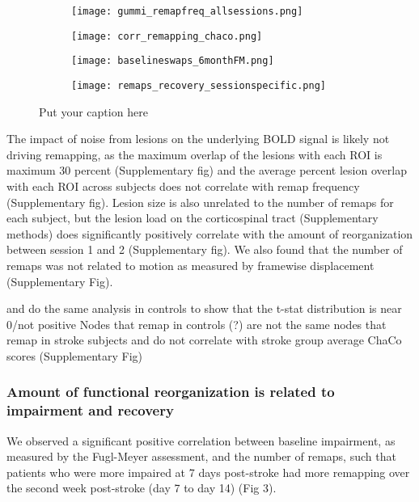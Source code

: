 \documentclass[10pt]{article}
\begin{document}
	\begin{figure}[ht]
		\begin{subfigure}{.5\textwidth}
			\centering
			\texttt{[image: gummi\_remapfreq\_allsessions.png]}  

			\label{fig:sub-first}
		\end{subfigure}
		\begin{subfigure}{.5\textwidth}
			\centering
			\texttt{[image: corr\_remapping\_chaco.png]}  

			\label{fig:sub-second}
		\end{subfigure}
	\end{figure}



	\begin{figure}
		\begin{subfigure}{.5\textwidth}
			\centering
			\texttt{[image: baselineswaps\_6monthFM.png]}  

			\label{fig:sub-second}
		\end{subfigure}
		\begin{subfigure}{.5\textwidth}
			\centering
			\texttt{[image: remaps\_recovery\_sessionspecific.png]}  
			\label{fig:sub-second}
		\end{subfigure}
		\caption{Put your caption here}
		\label{fig:fig}
	\end{figure}
	The impact of noise from lesions on the underlying BOLD signal is likely not driving remapping, as the maximum overlap of the lesions with each ROI is maximum 30 percent (Supplementary fig) and the average percent lesion overlap with each ROI across subjects does not correlate with remap frequency (Supplementary fig). Lesion size is also unrelated to the number of remaps for each subject, but the lesion load on the corticospinal tract (Supplementary methods) does significantly positively correlate with the amount of reorganization between session 1 and 2 (Supplementary fig). We also found that the number of remaps was not related to motion as measured by framewise displacement (Supplementary Fig).
	
	and do the same analysis in controls to show that the t-stat distribution is near 0/not positive
	Nodes that remap in controls (?) are not the same nodes that remap in stroke subjects and do not correlate with stroke group average ChaCo scores (Supplementary Fig)
	
	\subsubsection*{Amount of functional reorganization is related to impairment and recovery}
	We observed a significant positive correlation between baseline impairment, as measured by the Fugl-Meyer assessment, and the number of remaps, such that patients who were more impaired at 7 days post-stroke had more remapping over the second week post-stroke (day 7 to day 14) (Fig 3). 
	
\end{document}
